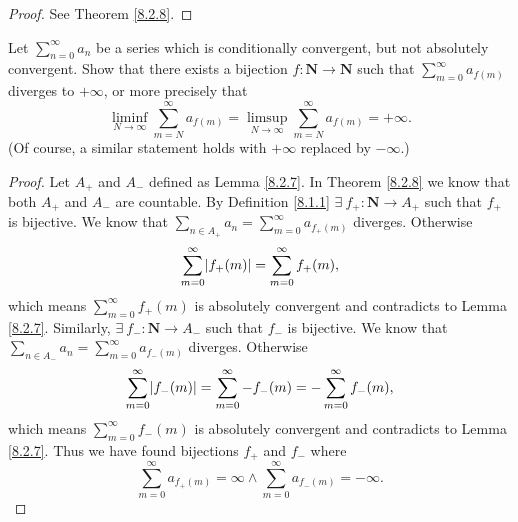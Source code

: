 \begin{proof}
    See Theorem \ref{8.2.8}.
\end{proof}

\begin{exercise}\label{ex 8.2.6}
    Let \(\sum_{n = 0}^\infty a_n\) be a series which is conditionally convergent, but not absolutely convergent.
    Show that there exists a bijection \(f : \mathbf{N} \to \mathbf{N}\) such that \(\sum_{m = 0}^\infty a_{f(m)}\) diverges to \(+\infty\), or more precisely that
    \[
        \liminf_{N \to \infty} \sum_{m = N}^\infty a_{f(m)} = \limsup_{N \to \infty} \sum_{m = N}^\infty a_{f(m)} = +\infty.
    \]
    (Of course, a similar statement holds with \(+\infty\) replaced by \(-\infty\).)
\end{exercise}

\begin{proof}
    Let \(A_+\) and \(A_-\) defined as Lemma \ref{8.2.7}.
    In Theorem \ref{8.2.8} we know that both \(A_+\) and \(A_-\) are countable.
    By Definition \ref{8.1.1} \(\exists\ f_+ : \mathbf{N} \to A_+\) such that \(f_+\) is bijective.
    We know that \(\sum_{n \in A_+} a_n = \sum_{m = 0}^\infty a_{f_+(m)}\) diverges.
    Otherwise
    \[
        \sum_{m = 0}^\infty \abs*{f_+(m)} = \sum_{m = 0}^\infty f_+(m),
    \]
    which means \(\sum_{m = 0}^\infty f_+(m)\) is absolutely convergent and contradicts to Lemma \ref{8.2.7}.
    Similarly, \(\exists\ f_- : \mathbf{N} \to A_-\) such that \(f_-\) is bijective.
    We know that \(\sum_{n \in A_-} a_n = \sum_{m = 0}^\infty a_{f_-(m)}\) diverges.
    Otherwise
    \[
        \sum_{m = 0}^\infty \abs*{f_-(m)} = \sum_{m = 0}^\infty -f_-(m) = -\sum_{m = 0}^\infty f_-(m),
    \]
    which means \(\sum_{m = 0}^\infty f_-(m)\) is absolutely convergent and contradicts to Lemma \ref{8.2.7}.
    Thus we have found bijections \(f_+\) and \(f_-\) where
    \[
        \sum_{m = 0}^\infty a_{f_+(m)} = \infty \land \sum_{m = 0}^\infty a_{f_-(m)} = -\infty.
    \]
\end{proof}